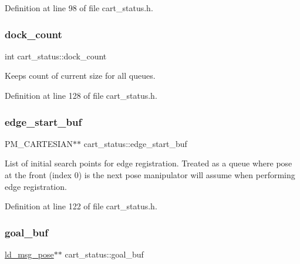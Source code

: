 Definition at line 98 of file cart\+\_\+status.\+h.

\mbox{\label{classcart__status_a37e9ce8c21a0d76250866a6fd7550024}} 
\subsubsection{\texorpdfstring{dock\+\_\+count}{dock\_count}}
{\footnotesize\ttfamily int cart\+\_\+status\+::dock\+\_\+count\hspace{0.3cm}{\ttfamily [private]}}

Keeps count of current size for all queues. 

Definition at line 128 of file cart\+\_\+status.\+h.

\mbox{\label{classcart__status_ab0947b06cd41da791e41a480c42f795e}} 
\subsubsection{\texorpdfstring{edge\+\_\+start\+\_\+buf}{edge\_start\_buf}}
{\footnotesize\ttfamily P\+M\+\_\+\+C\+A\+R\+T\+E\+S\+I\+AN$\ast$$\ast$ cart\+\_\+status\+::edge\+\_\+start\+\_\+buf\hspace{0.3cm}{\ttfamily [private]}}

List of initial search points for edge registration. Treated as a queue where pose at the front (index 0) is the next pose manipulator will assume when performing edge registration. 

Definition at line 122 of file cart\+\_\+status.\+h.

\mbox{\label{classcart__status_a4912ff0b77258f77f4f7c118ad8345c7}} 
\subsubsection{\texorpdfstring{goal\+\_\+buf}{goal\_buf}}
{\footnotesize\ttfamily \mbox{\hyperlink{structld__msg__pose}{ld\+\_\+msg\+\_\+pose}}$\ast$$\ast$ cart\+\_\+status\+::goal\+\_\+buf\hspace{0.3cm}{\ttfamily [private]}}

